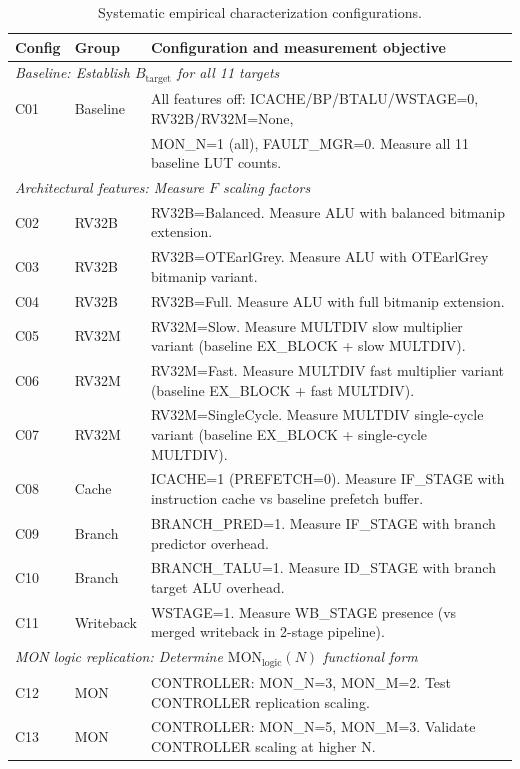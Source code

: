 \begin{table}[htbp]
\centering
\caption{Systematic empirical characterization configurations.}
\label{tab:pblock_configs}
\setlength{\tabcolsep}{3pt}
\scriptsize
\renewcommand{\arraystretch}{1.15}
\begin{tabularx}{\linewidth}{@{}llX@{}}
\toprule
Config & Group & Configuration and measurement objective \\
\midrule
\multicolumn{3}{l}{\textit{Baseline: Establish $B_{\text{target}}$ for all 11 targets}} \\
C01 & Baseline & All features off: ICACHE/BP/BTALU/WSTAGE=0, RV32B/RV32M=None, \\
 & & MON\_N=1 (all), FAULT\_MGR=0. Measure all 11 baseline LUT counts. \\
\midrule
\multicolumn{3}{l}{\textit{Architectural features: Measure $F$ scaling factors}} \\
C02 & RV32B & RV32B=Balanced. Measure ALU with balanced bitmanip extension. \\
C03 & RV32B & RV32B=OTEarlGrey. Measure ALU with OTEarlGrey bitmanip variant. \\
C04 & RV32B & RV32B=Full. Measure ALU with full bitmanip extension. \\
C05 & RV32M & RV32M=Slow. Measure MULTDIV slow multiplier variant (baseline EX\_BLOCK + slow MULTDIV). \\
C06 & RV32M & RV32M=Fast. Measure MULTDIV fast multiplier variant (baseline EX\_BLOCK + fast MULTDIV). \\
C07 & RV32M & RV32M=SingleCycle. Measure MULTDIV single-cycle variant (baseline EX\_BLOCK + single-cycle MULTDIV). \\
C08 & Cache & ICACHE=1 (PREFETCH=0). Measure IF\_STAGE with instruction cache vs baseline prefetch buffer. \\
C09 & Branch & BRANCH\_PRED=1. Measure IF\_STAGE with branch predictor overhead. \\
C10 & Branch & BRANCH\_TALU=1. Measure ID\_STAGE with branch target ALU overhead. \\
C11 & Writeback & WSTAGE=1. Measure WB\_STAGE presence (vs merged writeback in 2-stage pipeline). \\
\midrule
\multicolumn{3}{l}{\textit{MON logic replication: Determine $\text{MON}_{\text{logic}}(N)$ functional form}} \\
C12 & MON & CONTROLLER: MON\_N=3, MON\_M=2. Test CONTROLLER replication scaling. \\
C13 & MON & CONTROLLER: MON\_N=5, MON\_M=3. Validate CONTROLLER scaling at higher N. \\

\end{tabularx}
\end{table}
